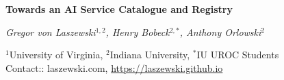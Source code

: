 \documentclass[A0,6pt]{article}
\date{}
\begin{document}
\thispagestyle{empty}
\vspace{-3.5cm}


\begin{figure}[!h]
\begin{tcolorbox}[enhanced,
  frame style,
  colback=red!10,
  colframe=red!75!black]

{\Large\bf Towards an AI Service Catalogue and Registry}


{\em Gregor von Laszewski$^{1,2}$,
Henry Bobeck$^{2,*}$,
Anthony Orlowski$^2$

$^1$University of Virginia, 
$^2$Indiana University, $^*$IU UROC Students \hfill {\footnotesize Contact:: laszewski\@gmail.com, \url{https://laszewski.github.io}}

}
\end{tcolorbox}
\vspace{-24pt}
\end{figure}
\end{document}
